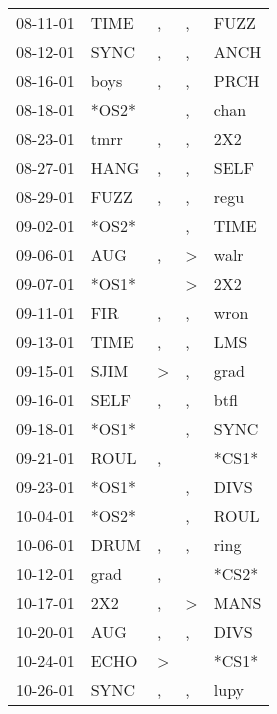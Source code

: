 \begin{supertabular}{lllll}
 08-11-01 &   TIME &                , &             , &   FUZZ \\
 08-12-01 &   SYNC &                , &             , &   ANCH \\
 08-16-01 &   boys &                , &             , &   PRCH \\
 08-18-01 &  *OS2* &                  &             , &   chan \\
 08-23-01 &   tmrr &                , &             , &    2X2 \\
 08-27-01 &   HANG &                , &             , &   SELF \\
 08-29-01 &   FUZZ &                , &             , &   regu \\
 09-02-01 &  *OS2* &                  &             , &   TIME \\
 09-06-01 &    AUG &                , &  \textgreater &   walr \\
 09-07-01 &  *OS1* &                  &  \textgreater &    2X2 \\
 09-11-01 &    FIR &                , &             , &   wron \\
 09-13-01 &   TIME &                , &             , &    LMS \\
 09-15-01 &   SJIM &     \textgreater &             , &   grad \\
 09-16-01 &   SELF &                , &             , &   btfl \\
 09-18-01 &  *OS1* &                  &             , &   SYNC \\
 09-21-01 &   ROUL &                , &               &  *CS1* \\
 09-23-01 &  *OS1* &                  &             , &   DIVS \\
 10-04-01 &  *OS2* &                  &             , &   ROUL \\
 10-06-01 &   DRUM &                , &             , &   ring \\
 10-12-01 &   grad &                , &               &  *CS2* \\
 10-17-01 &    2X2 &                , &  \textgreater &   MANS \\
 10-20-01 &    AUG &                , &             , &   DIVS \\
 10-24-01 &   ECHO &     \textgreater &               &  *CS1* \\
 10-26-01 &   SYNC &                , &             , &   lupy \\

\end{supertabular}
